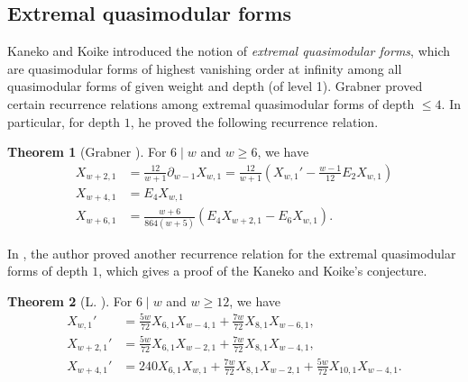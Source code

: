 \documentclass[10pt,reqno]{amsproc}
\newcommand{\1}{\mathds{1}}	%
\theoremstyle{definition}
\newtheorem{theorem}{Theorem}[section]
\theoremstyle{remark}
\begin{document}
\subsection{Extremal quasimodular forms}
\label{subsec:prelim_extqmf}

Kaneko and Koike \cite{kaneko2006extremal} introduced the notion of \emph{extremal quasimodular forms}, which are quasimodular forms of highest vanishing order at infinity among all quasimodular forms of given weight and depth (of level 1).
Grabner \cite{grabner2020quasimodular} proved certain recurrence relations among extremal quasimodular forms of depth $\le 4$.
In particular, for depth $1$, he proved the following recurrence relation.

\begin{theorem}[Grabner {\cite[Proposition 6.1]{grabner2020quasimodular}}]
    \label{thm:Xw1rec_grabner}
    For $6 \mid w$ and $w \ge 6$, we have
    \begin{align}
        X_{w+2, 1} &= \frac{12}{w+1} \partial_{w-1}X_{w, 1} = \frac{12}{w+1}\left(X_{w, 1}' - \frac{w-1}{12} E_2 X_{w, 1}\right) \label{eqn:recXw2} \\
        X_{w+4, 1} &= E_4 X_{w, 1} \label{eqn:recXw4} \\
        X_{w+6, 1} &= \frac{w+6}{864(w+5)} (E_4 X_{w+2, 1} - E_6 X_{w, 1}). \label{eqn:recXw6}
    \end{align}
\end{theorem}

In \cite{lee2024algebraic}, the author proved another recurrence relation for the extremal quasimodular forms of depth $1$, which gives a proof of the Kaneko and Koike's conjecture.

\begin{theorem}[L. {\cite[Theorem 4.3, Remark 4.5]{lee2024algebraic}}]
    \label{thm:Xw1rec}
    For $6 \mid w$ and $w \ge 12$, we have
    \begin{align}
        X_{w, 1}' &= \frac{5w}{72} X_{6, 1} X_{w-4, 1} + \frac{7w}{72} X_{8, 1} X_{w-6, 1}, \label{eqn:extqmf_rec1} \\
        X_{w+2, 1}' &= \frac{5w}{72} X_{6, 1} X_{w-2, 1} + \frac{7w}{72} X_{8, 1} X_{w-4, 1}, \label{eqn:extqmf_rec2} \\
        X_{w+4, 1}' &= 240 X_{6, 1} X_{w, 1} + \frac{7w}{72} X_{8, 1} X_{w-2, 1} + \frac{5w}{72} X_{10, 1} X_{w-4, 1}. \label{eqn:extqmf_rec3}
    \end{align}
\end{theorem}
\end{document}
